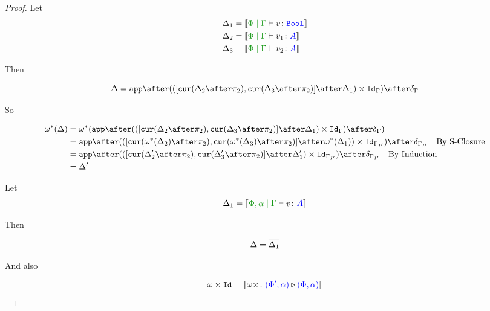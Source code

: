 \documentclass{report}
\begin{document}
\begin{framed}
\begin{proof}
        
        Let \begin{align*}
            \D_1 &= \deno{\gpetyperelation{v}{\B}}\\
            \D_2 &= \deno{\gpetyperelation{v_1}{A}}\\
            \D_3 &= \deno{\gpetyperelation{v_2}{A}}\\
        \end{align*}
        
        Then
        
        \begin{equation}
            \D = \app\after(([\cur{\D_2\after\pp}, \cur{\D_3\after\pp}]\after\D_1)\times\Id{\G})\after\diag{\G}\\
        \end{equation}
        
        So
        
        \begin{align*}
            \w\star(\D) &= \w\star(\app\after(([\cur{\D_2\after\pp}, \cur{\D_3\after\pp}]\after\D_1)\times\Id{\G})\after\diag{\G})\\
            &= \app\after(([\cur{\w\star(\D_2)\after\pp}, \cur{\w\star(\D_3)\after\pp}]\after\w\star(\D_1))\times\Id{\G_{I'}})\after\diag{\G_{I'}}\qt{By S-Closure}\\
            &= \app\after(([\cur{\D_2'\after\pp}, \cur{\D_3'\after\pp}]\after\D_1')\times\Id{\G_{I'}})\after\diag{\G_{I'}}\qt{By Induction}\\
            & = \D'\\
        \end{align*}
        
        
        
        Let \begin{equation}
            \D_1 = \deno{\etyperelation{\P,\a}{\G}{v}{A}}
        \end{equation}
        
        Then
        
        \begin{equation}
            \Delta = \overline{\Delta_1}\\
        \end{equation}
        
        And also
        
        \begin{equation}
            \omega\times\texttt{Id}_{} = {\bf [\![}\omega\times \colon {\color{blue}(\Phi',\alpha)} \triangleright {\color {blue} (\Phi,\alpha)}{\bf ]\!]}
        \end{equation}
        

\end{proof}
\end{framed}
\end{document}
